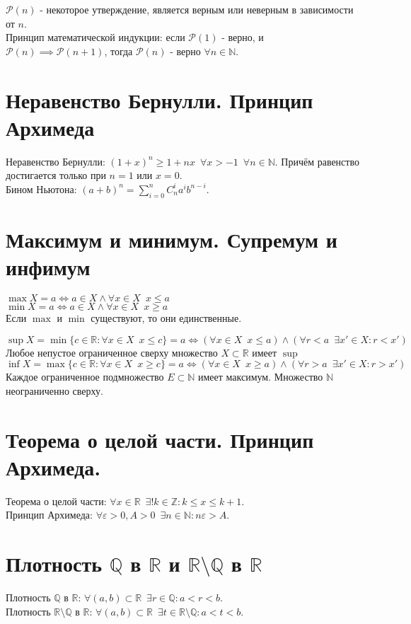 \documentclass[11pt, a4paper]{article}
\def\R{\mathbb{R}}
\def\Q{\mathbb{Q}}
\def\Z{\mathbb{Z}}
\def\N{\mathbb{N}}
\def\sp{\, \, \,}
\begin{document}
    $\mathcal{P}(n)$ - некоторое утверждение, является верным или неверным в зависимости от $n$.\\
    Принцип математической индукции: если $\mathcal{P}(1)$ - верно, и $\mathcal{P}(n) \implies \mathcal{P}(n+1)$, тогда $\mathcal{P}(n)$ - верно $\forall n \in \N$.

    \section{Неравенство Бернулли. Принцип Архимеда}
    Неравенство Бернулли: $(1+x)^n \geq 1+nx \sp \forall x > -1 \sp \forall n \in \N$. Причём равенство достигается только при $n = 1$ или $x = 0$.\\
    Бином Ньютона: $\displaystyle (a+b)^n = \sum_{i=0}^n C_n^i a^i b^{n-i}$.

    \section{Максимум и минимум. Супремум и инфимум}
    $\max X = a \iff a \in X \land \forall x \in X \sp x \leq a$\\
    $\min X = a \iff a \in X \land \forall x \in X \sp x \geq a$\\
    Если $\max$ и $\min$ существуют, то они единственные.

    $\sup X = \min \{c \in \R: \forall x \in X \sp x \leq c\} = a \iff (\forall x \in X \sp x \leq a) \land (\forall r < a \sp \exists x' \in X: r < x')$\\
    Любое непустое ограниченное сверху множество $X \subset \R$ имеет $\sup$\\
    $\inf X = \max \{c \in \R: \forall x \in X \sp x \geq c\} = a \iff (\forall x \in X \sp x \geq a) \land (\forall r > a \sp \exists x' \in X: r > x')$\\

    Каждое ограниченное подмножество $E \subset \N$ имеет максимум. Множество $\N$ неограниченно сверху.

    \section{Теорема о целой части. Принцип Архимеда.}
    Теорема о целой части: $\forall x \in \R \sp \exists ! k \in \Z: k \leq x \leq k+1$.\\
    Принцип Архимеда: $\forall \varepsilon > 0 , A > 0 \sp \exists n \in \N : n\varepsilon > A$.

    \section{Плотность $\Q$ в $\R$ и $\R \setminus \Q$ в $\R$}
    Плотность $\Q$ в $\R$: $\forall (a,b) \subset \R \sp \exists r \in \Q: a < r < b$.\\
    Плотность $\R \setminus \Q$ в $\R$: $\forall (a,b) \subset \R \sp \exists t \in \R \setminus \Q : a < t < b$.
\end{document}
